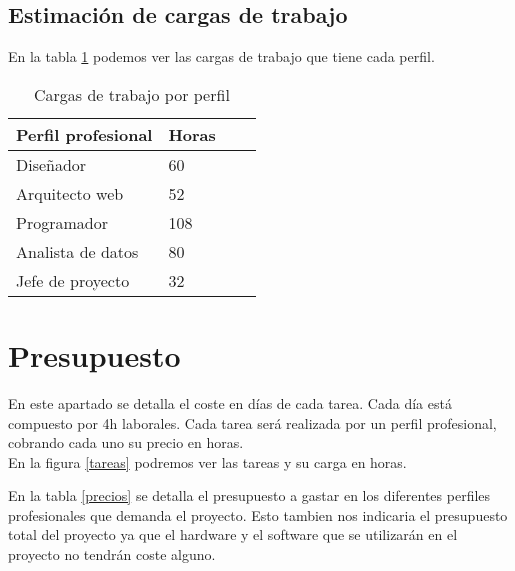 \subsection{Estimación de cargas de trabajo}
En la tabla \ref{cargas} podemos ver las cargas de trabajo que tiene cada perfil.
\begin{table}[]
	\centering
	\begin{tabular}{llll}
		\textbf{Perfil profesional} & \textbf{Horas}  \\ \hline
		Diseñador                   & 60             \\
		Arquitecto web              & 52             \\
		Programador                 & 108             \\
		Analista de datos           & 80             \\
		Jefe de proyecto            & 32             \\
	\end{tabular}
	\caption{Cargas de trabajo por perfil}
	\label{cargas}
\end{table}


\section{Presupuesto}
En este apartado se detalla el coste en días de cada tarea. Cada día está compuesto por 4h laborales. Cada tarea será realizada por un perfil profesional, cobrando cada uno su precio en horas.\\

En la figura \ref{tareas} podremos ver las tareas y su carga en horas.\\


En la tabla \ref{precios} se detalla el presupuesto a gastar en los diferentes perfiles profesionales que demanda el proyecto. Esto tambien nos indicaria el presupuesto total del proyecto ya que el hardware y el software que se utilizarán en el proyecto no tendrán coste alguno.

